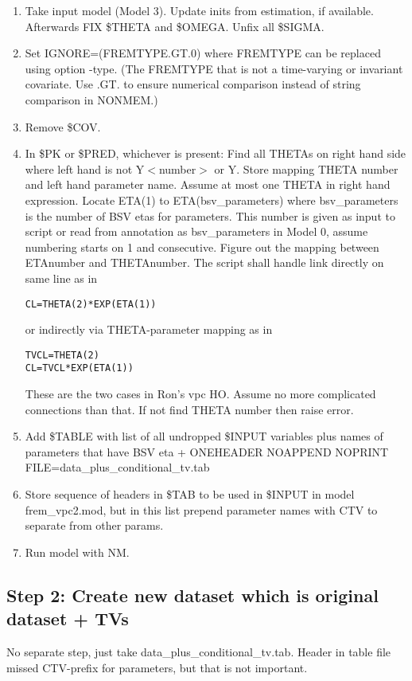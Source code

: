 \begin{enumerate}
	\item Take input model (Model 3). Update inits from estimation, if available. Afterwards FIX \$THETA and \$OMEGA. Unfix all \$SIGMA.
	\item Set IGNORE=(FREMTYPE.GT.0) where FREMTYPE can be replaced using option -type.
(The FREMTYPE that is not a time-varying or invariant covariate. Use .GT. to ensure numerical comparison instead of string comparison in NONMEM.)
	\item Remove \$COV.
	\item In \$PK or \$PRED, whichever is present: 
Find all THETAs on right hand side where left hand is not Y$<$number$>$ or Y. Store mapping THETA number and left hand parameter name. Assume at most one THETA in right hand expression.  
Locate ETA(1) to ETA(bsv\_parameters) where bsv\_parameters is the number of BSV etas for parameters. This number is given as input to script or read from annotation as bsv\_parameters in Model 0, assume numbering starts on 1 and consecutive. Figure out the mapping between ETAnumber and THETAnumber. The script shall handle link directly on same line as in 
\begin{verbatim}
CL=THETA(2)*EXP(ETA(1))
\end{verbatim} 
or indirectly via THETA-parameter mapping as in 
\begin{verbatim}
TVCL=THETA(2)
CL=TVCL*EXP(ETA(1))
\end{verbatim}  
These are the two cases in Ron's vpc HO. Assume no more complicated connections than that. If not find THETA number then raise error.
	\item Add \$TABLE with list of all undropped \$INPUT variables plus names of parameters that have BSV eta  + ONEHEADER NOAPPEND NOPRINT FILE=data\_plus\_conditional\_tv.tab
	\item Store sequence of headers in \$TAB to be used in \$INPUT in model frem\_vpc2.mod, but in this list prepend parameter names with CTV to separate from other params.
	\item Run model with NM.
\end{enumerate}

\subsection{Step 2: Create new dataset which is original dataset + TVs}
No separate step, just take data\_plus\_conditional\_tv.tab. Header in table file missed CTV-prefix for parameters, but that is not important.

